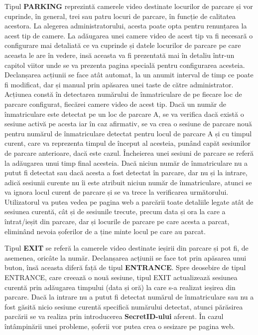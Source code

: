 \documentclass[12pt]{article}
\begin{document}
Tipul \textbf{PARKING} reprezint\u{a} camerele video destinate locurilor de parcare și vor cuprinde, \^{i}n general, trei sau patru locuri de parcare, \^{i}n funcție de calitatea acestora. La alegerea administratorului, acesta poate opta pentru renunțarea la acest tip de camere. La ad\u{a}ugarea unei camere video de acest tip va fi necesar\u{a} o configurare mai detaliat\u{a} ce va cuprinde și datele locurilor de parcare pe care aceasta le are \^{i}n vedere, ins\u{a} aceasta va fi prezentat\u{a} mai \^{i}n detaliu \^{i}ntr-un capitol viitor unde se va prezenta pagina special\u{a} pentru configurarea acesteia. Declanșarea acțiunii se face at\^{a}t automat, la un anumit interval de timp ce poate fi modificat, dar și manual prin ap\u{a}sarea unei taste de c\u{a}tre administrator. Acțiunea const\u{a} \^{i}n detectarea num\u{a}rului de \^{i}nmatriculare de pe fiecare loc de parcare configurat, fiec\u{a}rei camere video de acest tip. Dac\u{a} un num\u{a}r de \^{i}nmatriculare este detectat pe un loc de parcare A, se va verifica dac\u{a} exist\u{a} o sesiune activ\u{a} pe acesta iar \^{i}n caz afirmativ, se va crea o sesiune de parcare nou\u{a} pentru num\u{a}rul de \^{i}nmatriculare detectat pentru locul de parcare A și cu timpul curent, care va reprezenta timpul de \^{i}nceput al acesteia, pun\^{a}nd cap\u{a}t sesiunilor de parcare anterioare, dac\u{a} este cazul. \^{I}ncheierea unei sesiuni de parcare se refer\u{a} la ad\u{a}ugarea unui timp final acesteia. Dac\u{a} niciun num\u{a}r de \^{i}nmatriculare nu a putut fi detectat sau dac\u{a} acesta a fost detectat \^{i}n parcare, dar nu și la intrare, adic\u{a} sesiunii curente nu \^{i}i este atribuit niciun num\u{a}r de \^{i}nmatriculare, atunci se va ignora locul curent de parcare și se va trece la verificarea urm\u{a}torului. Utilizatorul va putea vedea pe pagina web a parc\u{a}rii toate detaliile legate at\^{a}t de sesiunea curent\u{a}, c\^{a}t și de sesiunile trecute, precum data și ora la care a \^{i}ntrat/ieșit din parcare, dar și locurile de parcare pe care acesta a parcat, elimin\^{a}nd nevoia șoferilor de a ține minte locul pe care au parcat.

Tipul \textbf{EXIT} se refer\u{a} la camerele video destinate ieșirii din parcare și pot fi, de asemenea, oric\^{a}te la num\u{a}r. Declanșarea acțiunii se face tot prin ap\u{a}sarea unui buton, \^{i}ns\u{a} aceasta difer\u{a} faț\u{a} de tipul \textbf{ENTRANCE}. Spre deosebire de tipul ENTRANCE, care creeaz\u{a} o nou\u{a} sesiune, tipul EXIT actualizeaz\u{a} sesiunea curent\u{a} prin ad\u{a}ugarea timpului (data și or\u{a}) la care s-a realizat ieșirea din parcare. Dac\u{a} la intrare nu a putut fi detectat num\u{a}rul de \^{i}nmatriculare sau nu a fost g\u{a}sit\u{a} nicio sesiune curent\u{a} specific\u{a} num\u{a}rului detectat, atunci p\u{a}r\u{a}sirea parc\u{a}rii se va realiza prin introducerea \textbf{SecretID-ului} aferent. \^{I}n cazul \^{i}nt\^{a}mpin\u{a}rii unei probleme, șoferii vor putea crea o sesizare pe pagina web.
\end{document}
